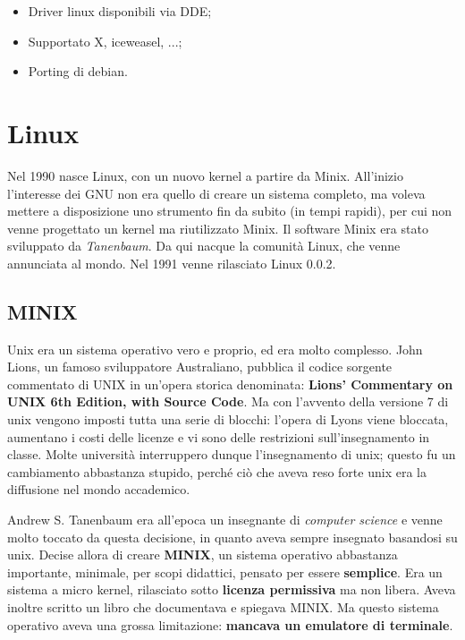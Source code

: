 \begin{itemize}
	
	\item Driver linux disponibili via DDE;
	\item Supportato X, iceweasel, ...;
	\item Porting di debian.
	
\end{itemize} 

\section{Linux}

Nel 1990 nasce Linux, con un nuovo kernel a partire da Minix. All'inizio l'interesse dei GNU non era quello di creare un sistema completo, ma voleva mettere a disposizione uno strumento fin da subito (in tempi rapidi), per cui non venne progettato un kernel ma riutilizzato Minix. Il software Minix era stato sviluppato da \textit{Tanenbaum}. Da qui nacque la comunità Linux, che venne annunciata al mondo. Nel 1991 venne rilasciato Linux 0.0.2.

\subsection{MINIX}

Unix era un sistema operativo vero e proprio, ed era molto complesso. John Lions, un famoso sviluppatore Australiano, pubblica il codice sorgente commentato di UNIX in un'opera storica denominata: \textbf{Lions' Commentary on UNIX 6th Edition, with Source Code}. Ma con l'avvento della versione 7 di unix vengono imposti tutta una serie di blocchi: l'opera di Lyons viene bloccata, aumentano i costi delle licenze e vi sono delle restrizioni sull'insegnamento in classe. Molte università interruppero dunque l'insegnamento di unix; questo fu un cambiamento abbastanza stupido, perché ciò che aveva reso forte unix era la diffusione nel mondo accademico. 

Andrew S. Tanenbaum era all'epoca un insegnante di \textit{computer science} e venne molto toccato da questa decisione, in quanto aveva sempre insegnato basandosi su unix. Decise allora di creare \textbf{MINIX}, un sistema operativo abbastanza importante, minimale, per scopi didattici, pensato per essere \textbf{semplice}. Era un sistema a micro kernel, rilasciato sotto \textbf{licenza permissiva} ma non libera. Aveva inoltre scritto un libro che documentava e spiegava MINIX. Ma questo sistema operativo aveva una grossa limitazione: \textbf{mancava un emulatore di terminale}.

